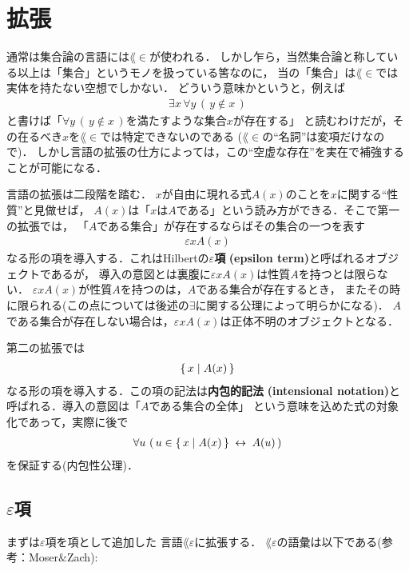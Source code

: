 \section{拡張}
	通常は集合論の言語には$\lang{\in}$が使われる．
	しかし乍ら，当然集合論と称している以上は「集合」というモノを扱っている筈なのに，
	当の「集合」は$\lang{\in}$では実体を持たない空想でしかない．
	どういう意味かというと，例えば
	\begin{align}	
		\exists x\, \forall y\, (\, y \notin x\, )
	\end{align}
	と書けば「$\forall y\, (\, y \notin x\, )$を満たすような集合$x$が存在する」
	と読むわけだが，その在るべき$x$を$\lang{\in}$では特定できないのである
	($\lang{\in}$の``名詞''は変項だけなので)．
	しかし言語の拡張の仕方によっては，この``空虚な存在''を実在で補強することが可能になる．
	
	言語の拡張は二段階を踏む．
	$x$が自由に現れる式$A(x)$のことを$x$に関する``性質''と見做せば，
	$A(x)$は「$x$は$A$である」という読み方ができる．そこで第一の拡張では，
	「$A$である集合」が存在するならばその集合の一つを表す
	\begin{align}
		\varepsilon x A(x)
	\end{align}
	なる形の項を導入する．これはHilbertの{\bf $\varepsilon$項}
	{\bf (epsilon term)}と呼ばれるオブジェクトであるが，
	導入の意図とは裏腹に$\varepsilon x A(x)$は性質$A$を持つとは限らない．
	$\varepsilon x A(x)$が性質$A$を持つのは，$A$である集合が存在するとき，
	またその時に限られる(この点については後述の$\exists$に関する公理によって明らかになる)．
	$A$である集合が存在しない場合は，$\varepsilon x A(x)$は正体不明のオブジェクトとなる．
	
	第二の拡張では
	\begin{align}
		\{\, x \mid A(x)\, \}
	\end{align}
	なる形の項を導入する．この項の記法は{\bf 内包的記法}
	{\bf (intensional notation)}と呼ばれる．導入の意図は「$A$である集合の全体」
	という意味を込めた式の対象化であって，実際に後で
	\begin{align}
		\forall u\, \left(\, u \in \{\, x \mid A(x)\, \} \hspace{0.25em}\leftrightarrow\hspace{0.25em} A(u)\, \right)
	\end{align}
	を保証する(内包性公理)．
	
\subsection{$\varepsilon$項}
	まずは$\varepsilon$項を項として追加した
	言語$\lang{\varepsilon}$に拡張する．
	$\lang{\varepsilon}$の語彙は以下である(参考：Moser$\&$Zach\cite{Moser_Zach}):
	
